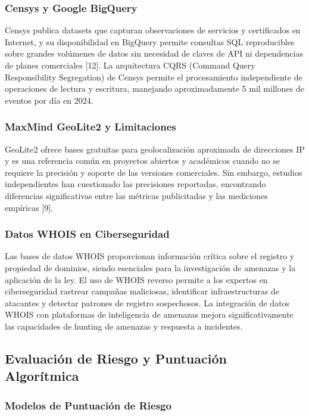 \subsubsection{Censys y Google BigQuery}

Censys publica datasets que capturan observaciones de servicios y certificados en Internet, y su disponibilidad en BigQuery permite consultas SQL reproducibles sobre grandes volúmenes de datos sin necesidad de claves de API ni dependencias de planes comerciales [12]. La arquitectura CQRS (Command Query Responsibility Segregation) de Censys permite el procesamiento independiente de operaciones de lectura y escritura, manejando aproximadamente 5 mil millones de eventos por día en 2024.

\subsubsection{MaxMind GeoLite2 y Limitaciones}

GeoLite2 ofrece bases gratuitas para geolocalización aproximada de direcciones IP y es una referencia común en proyectos abiertos y académicos cuando no se requiere la precisión y soporte de las versiones comerciales. Sin embargo, estudios independientes han cuestionado las precisiones reportadas, encontrando diferencias significativas entre las métricas publicitadas y las mediciones empíricas [9].

\subsubsection{Datos WHOIS en Ciberseguridad}

Las bases de datos WHOIS proporcionan información crítica sobre el registro y propiedad de dominios, siendo esenciales para la investigación de amenazas y la aplicación de la ley. El uso de WHOIS reverso permite a los expertos en ciberseguridad rastrear campañas maliciosas, identificar infraestructuras de atacantes y detectar patrones de registro sospechosos. La integración de datos WHOIS con plataformas de inteligencia de amenazas mejora significativamente las capacidades de hunting de amenazas y respuesta a incidentes.

\subsection{Evaluación de Riesgo y Puntuación Algorítmica}

\subsubsection{Modelos de Puntuación de Riesgo}

